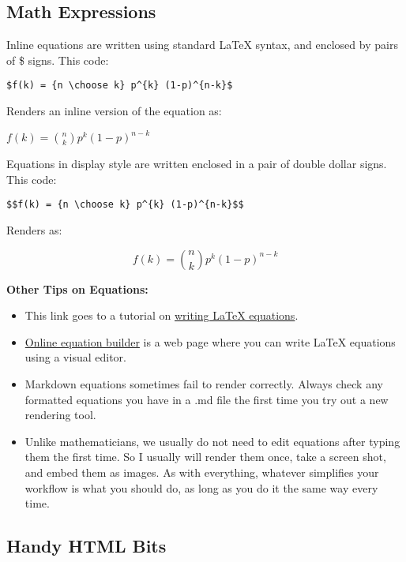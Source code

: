 \documentclass[
]{article}
\providecommand{\tightlist}{%
  \setlength{\itemsep}{0pt}\setlength{\parskip}{0pt}}
\begin{document}
\hypertarget{math-expressions}{%
\subsection{Math Expressions}\label{math-expressions}}

Inline equations are written using standard LaTeX syntax, and enclosed
by pairs of \$ signs. This code:

\texttt{\$f(k)\ =\ \{n\ \textbackslash{}choose\ k\}\ p\^{}\{k\}\ (1-p)\^{}\{n-k\}\$}

Renders an inline version of the equation as:

\(f(k) = {n \choose k} p^{k} (1-p)^{n-k}\)

Equations in display style are written enclosed in a pair of double
dollar signs. This code:

\texttt{\$\$f(k)\ =\ \{n\ \textbackslash{}choose\ k\}\ p\^{}\{k\}\ (1-p)\^{}\{n-k\}\$\$}

Renders as:

\[f(k) = {n \choose k} p^{k} (1-p)^{n-k}\]

\textbf{Other Tips on Equations:}

\begin{itemize}
\tightlist
\item
  This link goes to a tutorial on
  \href{https://www.overleaf.com/learn/latex/Mathematical_expressions}{writing
  LaTeX equations}.
\item
  \href{https://latex.codecogs.com/legacy/eqneditor/editor.php}{Online
  equation builder} is a web page where you can write LaTeX equations
  using a visual editor.
\item
  Markdown equations sometimes fail to render correctly. Always check
  any formatted equations you have in a .md file the first time you try
  out a new rendering tool.
\item
  Unlike mathematicians, we usually do not need to edit equations after
  typing them the first time. So I usually will render them once, take a
  screen shot, and embed them as images. As with everything, whatever
  simplifies your workflow is what you should do, as long as you do it
  the same way every time.
\end{itemize}

\hypertarget{handy-html-bits}{%
\subsection{Handy HTML Bits}\label{handy-html-bits}}
\end{document}
